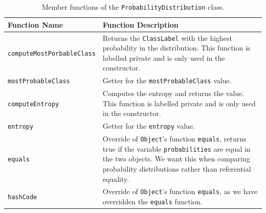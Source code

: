 \documentclass[12pt,twoside,notitlepage]{report}
\begin{document}
                \begin{table}[H]
                    \begin{tabularx}{\textwidth}{l|X}
                        \textbf{Function Name} & \textbf{Function Description} \\
                        \hline

                        \texttt{computeMostPorbableClass} & 
                            Returns the \texttt{ClassLabel} with the highest probability in the distribution. This 
                            function is labelled private and is only used in the constructor. \\ 
                        \hline

                        \texttt{mostProbableClass} & 
                            Getter for the \texttt{mostProbableClass} value. \\ 
                        \hline

                        \texttt{computeEntropy} & 
                            Computes the entropy and returns the value. This function is labelled private and is only 
                            used in the constructor. \\ 
                        \hline

                        \texttt{entropy} & 
                            Getter for the \texttt{entropy} value. \\ 
                        \hline

                        \texttt{equals} & 
                            Override of \texttt{Object}'s function \texttt{equals}, returns true if the variable 
                            \texttt{probabilities} are equal in the two objects. We want this when comparing 
                            probability distributions rather than referential equality. \\ 
                        \hline

                        \texttt{hashCode} & 
                            Override of \texttt{Object}'s function \texttt{equals}, as we have overridden the 
                            \texttt{equals} function. \\ 

                    \end{tabularx}
                    \caption{Member functions of the \texttt{ProbabilityDistribution} class.}
                    \label{tab:ProbabilityDistribution}
                \end{table}
\end{document}
